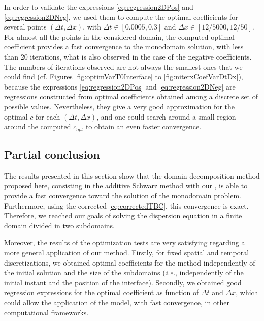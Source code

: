 \indent In order to validate the expressions \eqref{eq:regression2DPos} and \eqref{eq:regression2DNeg}, we used them to compute the optimal coefficients for several points $(\Delta t, \Delta x)$, with $\Delta t \in [0.0005,0.3]$ and $\Delta x \in \left[ 12/5000,12/50\right]$. For almost all the points in the considered domain, the computed optimal coefficient provides a fast convergence to the monodomain solution, with less than 20 iterations, what is also observed in the case of the negative coefficients. The numbers of iterations observed are not always the smallest ones that we could find (cf. Figures \ref{fig:optimVarT0Interface} to \ref{fig:niterxCoefVarDtDx}), because the expressions \eqref{eq:regression2DPos} and \eqref{eq:regression2DNeg} are regressions constructed from optimal coefficients obtained among a discrete set of possible values. Nevertheless, they give a very good approximation for the optimal $c$ for each $(\Delta t, \Delta x)$, and one could search around a small region around the computed $c_{opt}$ to obtain an even faster convergence.




\subsection{Partial conclusion}
 
\indent The results presented in this section show that the domain decomposition method proposed here, consisting in the additive Schwarz method with our  , is able to provide a fast convergence toward the solution of the monodomain problem. Furthermore, using the corrected  \eqref{eq:correctedTBC}, this convergence is exact. Therefore, we reached our goals of solving the dispersion equation in a finite domain divided in two subdomains.

\indent Moreover, the results of the optimization tests are very satisfying regarding a more general application of our method. Firstly, for fixed spatial and temporal discretizations, we obtained optimal coefficients for the method independently of the initial solution and the size of the subdomains (\emph{i.e.}, independently of the initial instant and the position of the interface). Secondly, we obtained good regression expressions for the optimal coefficient as function of $\Delta t$ and $\Delta x$, which could allow the application of the model, with fast convergence, in other computational frameworks.














